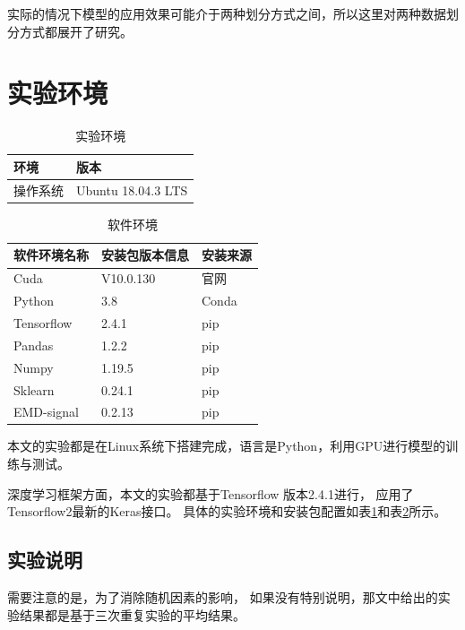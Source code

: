     实际的情况下模型的应用效果可能介于两种划分方式之间，所以这里对两种数据划分方式都展开了研究。
\section{实验环境}
  \begin{table}
      \centering
      \caption{实验环境}
      \begin{tabular}{ll}
        \toprule
        环境        & 版本                                        \\
        \midrule
        操作系统        & Ubuntu 18.04.3 LTS                          \\
        \bottomrule
      \end{tabular}
      \label{tab:env}
  \end{table}

  \begin{table}
    \centering
    \caption{软件环境}
    \begin{tabular}{lll}
      \toprule
      软件环境名称        & 安装包版本信息          & 安装来源                              \\
      \midrule
      Cuda        & V10.0.130     & 官网 \\
      Python      & 3.8           & Conda                              \\
      Tensorflow  & 2.4.1             & pip                          \\
      Pandas        &  1.2.2    & pip  \\
      Numpy        &    1.19.5   & pip \\
      Sklearn         &   0.24.1  & pip   \\
      EMD-signal     &  0.2.13 & pip \\

      \bottomrule
    \end{tabular}
    \label{tab:software}
  \end{table}
  本文的实验都是在Linux系统下搭建完成，语言是Python，利用GPU进行模型的训练与测试。

  深度学习框架方面，本文的实验都基于Tensorflow 版本2.4.1进行，
  应用了Tensorflow2最新的Keras接口。
  具体的实验环境和安装包配置如表\ref{tab:env}和表\ref{tab:software}所示。
  \subsection{实验说明}
    需要注意的是，为了消除随机因素的影响，
    如果没有特别说明，那文中给出的实验结果都是基于三次重复实验的平均结果。
